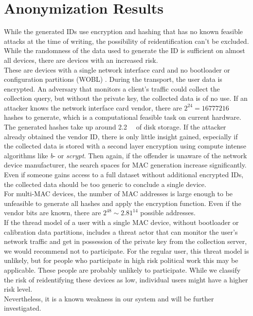 %
\newpage
%
 


\section{Anonymization Results}
\label{sec:results:anon}
    While the generated IDs use encryption and hashing that has no known feasible attacks at the time of writing, the possibility of reidentification can't be excluded. While the randomness of the data used to generate the ID is sufficient on almost all devices, there are devices with an increased risk.\\
    These are devices with a single network interface card and no bootloader or configuration partitions (WOBL) . During the transport, the user data is encrypted. An adversary that monitors a client's traffic could collect the collection query, but without the private key, the collected data is of no use. If an attacker knows the network interface card vendor, there are $2^{24} = 16777216$ hashes to generate, which is a computational feasible task on current hardware. The generated hashes take up around \SIlist{2.2}{\giga\byte} of disk storage.
    If the attacker already obtained the vendor ID, there is only little insight gained, especially if the collected data is stored with a second layer encryption using compute intense algorithms like \textit{b}- or \textit{scrypt}. 
    Then again, if the offender is unaware of the network device manufacturer, the search spaces for MAC generation increase significantly. Even if someone gains access to a full dataset without additional encrypted IDs, the collected data should be too generic to conclude a single device.\\
    For multi-MAC devices, the number of MAC addresses is large enough to be unfeasible to generate all hashes and apply the encryption function. Even if the vendor bits are known, there are $2^{48} \sim 2.81^{14}$ possible addresses.\\
    If the thread model of a user with a single MAC device, without bootloader or calibration data partitions, includes a threat actor that can monitor the user's network traffic and get in possession of the private key from the collection server, we would recommend not to participate. For the regular user, this threat model is unlikely, but for people who participate in high risk political work this may be applicable. These people are probably unlikely to participate. While we classify the risk of reidentifying these devices as low, individual users might have a higher risk level.\\
    Nevertheless, it is a known weakness in our system and will be further investigated.\\
    
